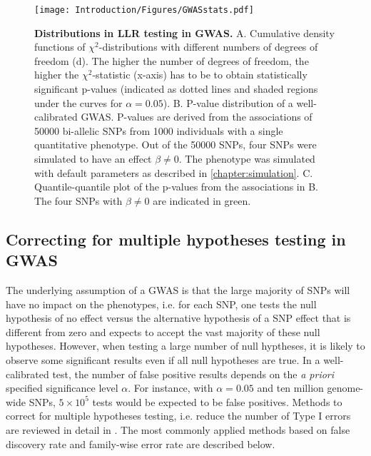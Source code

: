 \begin{figure}[hbtp]
	\centering
	\texttt{[image: Introduction/Figures/GWASstats.pdf]}
	\caption[\textbf{Log-likelihood ratio testing in GWAS.}]{\textbf{Distributions in LLR testing in GWAS. }A. Cumulative density functions of \(\chi^2\)-distributions with different numbers of degrees of freedom (d). The higher the number of degrees of freedom, the higher the \(\chi^2\)-statistic (x-axis) has to be to obtain statistically significant p-values (indicated as dotted lines and shaded regions under the curves for \(\alpha=0.05\)). B. P-value distribution of a well-calibrated GWAS. P-values are derived from the associations of \num{50000} bi-allelic SNPs from \num{1000} individuals with a single quantitative phenotype. Out of the \num{50000} SNPs, four SNPs were simulated to have an effect \(\beta \neq 0\). The phenotype was simulated with default parameters as described in \cref{chapter:simulation}.  C. Quantile-quantile plot of the p-values from the associations in B. The four SNPs with \(\beta \neq 0\) are indicated in green.}
	 	\label{fig:GWAS-stats}
\end{figure}

\subsection{Correcting for multiple hypotheses testing in GWAS}
\label{subsection:multiple-testing}
The underlying assumption of a GWAS is that the large majority of SNPs will have no impact on the phenotypes, i.e. for each SNP, one tests the null hypothesis of no effect versus the alternative hypothesis of a SNP effect that is different from zero and expects to accept the vast majority of these null hypotheses. However, when testing a large number of null hyptheses, it is likely to observe some significant results even if all null hypotheses are true. In a well-calibrated test, the number of false positive results depends on the \textit{a priori} specified significance level \(\alpha\). For instance, with  \(\alpha=0.05\) and ten million genome-wide SNPs, \(5 \times 10^5\) tests would be expected to be false positives. Methods to correct for multiple hypotheses testing, i.e. reduce the number of Type I errors are reviewed in detail in \citep{Shaffer1995}. The most commonly applied methods based on false discovery rate and family-wise error rate are described below.

